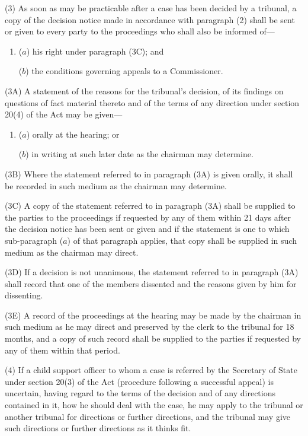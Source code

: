 \documentclass[a4paper]{article}
\begin{document}
(3) As soon as may be practicable after a case has been decided by a tribunal, a copy of the decision notice made in accordance with paragraph (2) shall be sent or given to every party to the proceedings who shall also be informed of—
\begin{enumerate}\item[]
($a$) his right under paragraph (3C); and

($b$) the conditions governing appeals to a Commissioner.
\end{enumerate}

(3A) A statement of the reasons for the tribunal’s decision, of its findings on questions of fact material thereto and of the terms of any direction under section 20(4) of the Act may be given—
\begin{enumerate}\item[]
($a$) orally at the hearing; or

($b$) in writing at such later date as the chairman may determine.
\end{enumerate}

(3B) Where the statement referred to in paragraph (3A) is given orally, it shall be recorded in such medium as the chairman may determine.

(3C) A copy of the statement referred to in paragraph (3A) shall be supplied to the parties to the proceedings if requested by any of them within 21 days after the decision notice has been sent or given and if the statement is one to which sub-paragraph ($a$) of that paragraph applies, that copy shall be supplied in such medium as the chairman may direct.

(3D) If a decision is not unanimous, the statement referred to in paragraph (3A) shall record that one of the members dissented and the reasons given by him for dissenting.

(3E) A record of the proceedings at the hearing may be made by the chairman in such medium as he may direct and preserved by the clerk to the tribunal for 18 months, and a copy of such record shall be supplied to the parties if requested by any of them within that period.

(4) If a child support officer to whom a case is referred by the Secretary of State under section 20(3) of the Act (procedure following a successful appeal) is uncertain, having regard to the terms of the decision and of any directions contained in it, how he should deal with the case, he may apply to the tribunal or another tribunal for directions or further directions, and the tribunal may give such directions or further directions as it thinks fit.
\end{document}

